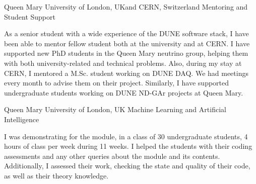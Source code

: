 	{%
		Queen Mary University of London, UK\newline \hfill and
		CERN, Switzerland}
	{%
		Mentoring and Student Support}
	{%
		\begin{justify}\noindent
			As a senior student with a wide experience of the DUNE software stack, I have been able to mentor fellow student both at the university and at CERN. I have supported new PhD students in the Queen Mary neutrino group, helping them with both university-related and technical problems. Also, during my stay at CERN, I mentored a M.Sc. student working on DUNE DAQ. We had meetings every month to advise them on their project. Similarly, I have supported undergraduate students working on DUNE ND-GAr projects at Queen Mary.
		\end{justify}
	}

	{%
		Queen Mary University of London, UK}
	{%
		Machine Learning and Artificial Intelligence}
	{%
		\begin{justify}\noindent
			I was demonstrating for the module, in a class of 30 undergraduate students, 4 hours of class per week during 11 weeks. I helped the students with their coding assessments and any other queries about the module and its contents. Additionally, I assessed their work, checking the state and quality of their code, as well as their theory knowledge.
		\end{justify}
	}